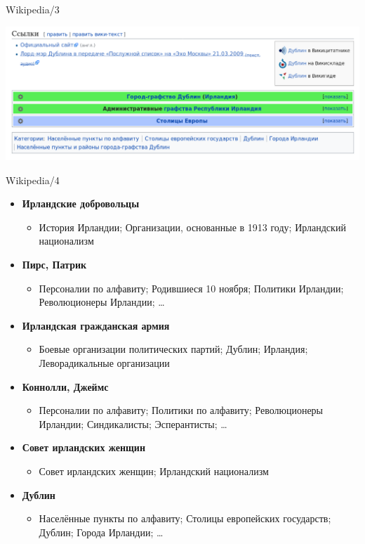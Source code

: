 \documentclass[10pt, compress]{beamer}
\begin{document}
\begin{frame}{Wikipedia/3}

\includegraphics[width=\textwidth]{graphics/wikipedia-2.png}

\end{frame}

\begin{frame}{Wikipedia/4}

\begin{itemize}
\item \textbf{Ирландские добровольцы}
  \begin{itemize}
    \item История Ирландии; \alert<2>{Организации, основанные в 1913 году}; Ирландский национализм
  \end{itemize}
\item \textbf{Пирс, Патрик}
  \begin{itemize}
    \item \alert<2>{Персоналии по алфавиту}; Родившиеся 10 ноября; \alert<2>{Политики Ирландии}; \alert<2>{Революционеры Ирландии}; \ldots
  \end{itemize}
\item \textbf{Ирландская гражданская армия}
\begin{itemize}
  \item \alert<2>{Боевые организации политических партий}; Дублин; Ирландия; \alert<2>{Леворадикальные организации}
\end{itemize}
\item \textbf{Коннолли, Джеймс}
\begin{itemize}
  \item \alert<2>{Персоналии по алфавиту}; \alert<2>{Политики по алфавиту}; \alert<2>{Революционеры Ирландии}; \alert<2>{Синдикалисты}; \alert<2>{Эсперантисты}; \ldots
\end{itemize}
\item \textbf{Совет ирландских женщин}
\begin{itemize}
  \item Совет ирландских женщин; Ирландский национализм
\end{itemize}
\item \textbf{Дублин}
\begin{itemize}
  \item \alert<2>{Населённые пункты по алфавиту}; \alert<2>{Столицы европейских государств}; Дублин; \alert<2>{Города Ирландии}; \ldots
\end{itemize}
\end{itemize}

\end{frame}
\end{document}
